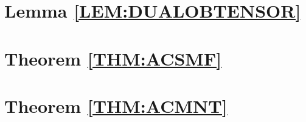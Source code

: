 \documentclass[a4paper,11pt,psamsfonts,reqno]{amsbook}
\theoremstyle{proposition}
\theoremstyle{proof}
\begin{document}
\section*{Lemma \ref{LEM:DUALOBTENSOR}}
\label{sec:lemdualobtensor}



\section*{Theorem \ref{THM:ACSMF}}
\label{sec:thmacsmf}



\section*{Theorem \ref{THM:ACMNT}}
\label{sec:thmacmnt}




\nocite{wiki-nlab0000}
\nocite{wiki-pedia0en}



\end{document}
